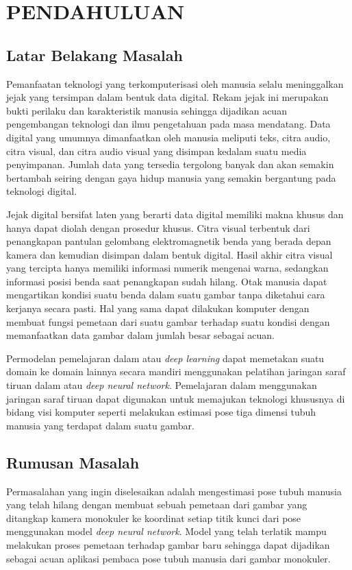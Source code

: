 
\chapter{PENDAHULUAN}
\label{cha:1-Pendahuluan}

\section{Latar Belakang Masalah}
\label{sec:1-LatarBelakangMasalah}

Pemanfaatan teknologi yang terkomputerisasi oleh manusia selalu meninggalkan jejak yang
tersimpan dalam bentuk data digital. Rekam jejak ini merupakan bukti perilaku dan karakteristik
manusia  sehingga dijadikan acuan pengembangan teknologi dan ilmu pengetahuan pada masa mendatang.
Data digital yang umumnya dimanfaatkan oleh manusia meliputi teks, citra audio, citra visual, dan
citra audio visual yang disimpan kedalam suatu media penyimpanan. Jumlah data yang tersedia
tergolong banyak dan akan semakin bertambah seiring dengan gaya hidup manusia yang semakin
bergantung pada teknologi digital.

Jejak digital bersifat laten yang berarti data digital memiliki makna khusus dan hanya dapat diolah
dengan prosedur khusus. Citra visual terbentuk dari penangkapan pantulan gelombang elektromagnetik
benda yang berada depan kamera dan kemudian disimpan dalam bentuk digital. Hasil akhir citra visual
yang tercipta hanya memiliki informasi numerik mengenai warna, sedangkan
informasi posisi benda saat penangkapan sudah hilang. Otak manusia dapat mengartikan kondisi suatu
benda dalam suatu gambar tanpa diketahui cara kerjanya secara pasti. Hal yang sama dapat
dilakukan komputer dengan membuat fungsi pemetaan dari suatu gambar terhadap suatu kondisi dengan
memanfaatkan data gambar dalam jumlah besar sebagai acuan.

Permodelan pemelajaran dalam atau \textit{deep learning} dapat memetakan suatu domain ke
domain lainnya secara mandiri menggunakan pelatihan jaringan saraf tiruan dalam atau
\textit{deep neural network}. Pemelajaran dalam menggunakan jaringan
saraf tiruan dapat digunakan untuk memajukan teknologi khususnya di bidang visi komputer
seperti melakukan estimasi pose tiga dimensi tubuh manusia yang terdapat dalam suatu gambar.

\section{Rumusan Masalah}
\label{sec:1-RumusanMasalah}
Permasalahan yang ingin diselesaikan adalah mengestimasi pose tubuh manusia yang
telah hilang dengan membuat sebuah pemetaan dari gambar yang ditangkap kamera monokuler ke
koordinat setiap titik kunci dari pose menggunakan model \textit{deep neural network}.
Model yang telah terlatik mampu melakukan proses
pemetaan terhadap gambar baru sehingga dapat dijadikan sebagai acuan aplikasi pembaca pose tubuh
manusia dari gambar monokuler.

